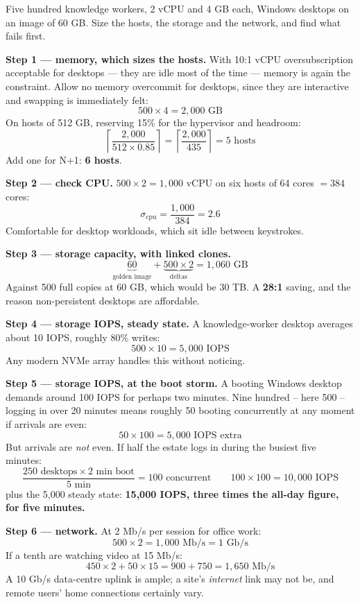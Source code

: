 \begin{worked}
Five hundred knowledge workers, 2 vCPU and 4 GB each, Windows desktops on an
image of 60 GB. Size the hosts, the storage and the network, and find what
fails first.

\smallskip
\textbf{Step 1 --- memory, which sizes the hosts.} With 10:1 vCPU
oversubscription acceptable for desktops --- they are idle most of the time ---
memory is again the constraint. Allow no memory overcommit for desktops, since
they are interactive and swapping is immediately felt:
\[ 500 \times 4 = 2{,}000 \text{ GB} \]
On hosts of 512 GB, reserving 15\% for the hypervisor and headroom:
\[ \left\lceil \frac{2{,}000}{512 \times 0.85} \right\rceil
   = \left\lceil \frac{2{,}000}{435} \right\rceil = 5 \text{ hosts} \]
Add one for N+1: \textbf{6 hosts}.

\smallskip
\textbf{Step 2 --- check CPU.} $500 \times 2 = 1{,}000$ vCPU on six hosts of 64
cores $= 384$ cores:
\[ \sigma_{\text{cpu}} = \frac{1{,}000}{384} = 2.6 \]
Comfortable for desktop workloads, which sit idle between keystrokes.

\smallskip
\textbf{Step 3 --- storage capacity, with linked clones.}
\[ \underbrace{60}_{\text{golden image}} + \underbrace{500 \times 2}_{\text{deltas}}
   = 1{,}060 \text{ GB} \]
Against 500 full copies at 60 GB, which would be 30 TB. A \textbf{28:1}
saving, and the reason non-persistent desktops are affordable.

\smallskip
\textbf{Step 4 --- storage IOPS, steady state.} A knowledge-worker desktop
averages about 10 IOPS, roughly 80\% writes:
\[ 500 \times 10 = 5{,}000 \text{ IOPS} \]
Any modern NVMe array handles this without noticing.

\smallskip
\textbf{Step 5 --- storage IOPS, at the boot storm.} A booting Windows desktop
demands around 100 IOPS for perhaps two minutes. Nine hundred -- here 500 --
logging in over 20 minutes means roughly 50 booting concurrently at any moment
if arrivals are even:
\[ 50 \times 100 = 5{,}000 \text{ IOPS extra} \]
But arrivals are \emph{not} even. If half the estate logs in during the busiest
five minutes:
\[ \frac{250 \text{ desktops} \times 2 \text{ min boot}}{5 \text{ min}}
   = 100 \text{ concurrent} \qquad 100 \times 100 = 10{,}000 \text{ IOPS} \]
plus the 5{,}000 steady state: \textbf{15{,}000 IOPS, three times the
all-day figure, for five minutes.}

\smallskip
\textbf{Step 6 --- network.} At 2 Mb/s per session for office work:
\[ 500 \times 2 = 1{,}000 \text{ Mb/s} = 1 \text{ Gb/s} \]
If a tenth are watching video at 15 Mb/s:
\[ 450 \times 2 + 50 \times 15 = 900 + 750 = 1{,}650 \text{ Mb/s} \]
A 10 Gb/s data-centre uplink is ample; a site's \emph{internet} link may not be,
and remote users' home connections certainly vary.


\end{worked}
